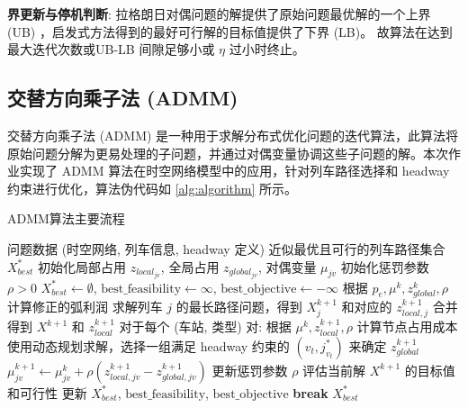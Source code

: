 \documentclass{article}
\begin{document}
\textbf{界更新与停机判断}:
拉格朗日对偶问题的解提供了原始问题最优解的一个上界 (UB) ，启发式方法得到的最好可行解的目标值提供了下界 (LB)。
故算法在达到最大迭代次数或UB-LB 间隙足够小或 $\eta$ 过小时终止。

\subsection{交替方向乘子法 (ADMM)}\label{subsec:-(admm)}
交替方向乘子法 (ADMM)
是一种用于求解分布式优化问题的迭代算法，此算法将原始问题分解为更易处理的子问题，并通过对偶变量协调这些子问题的解。本次作业实现了 ADMM
算法在时空网络模型中的应用，针对列车路径选择和 headway 约束进行优化，算法伪代码如 \ref{alg:algorithm} 所示。

\begin{algorithm}[h]
    \caption{ADMM算法主要流程}
    \begin{algorithmic}[1]
        \Require 问题数据 (时空网络, 列车信息, headway 定义)
        \Ensure 近似最优且可行的列车路径集合 $X_{best}^*$
        \State 初始化局部占用 $z_{local_{jv}}$, 全局占用 $z_{global_{jv}}$, 对偶变量 $\mu_{jv}$
        \State 初始化惩罚参数 $\rho > 0$
        \State $X_{best}^* \gets \emptyset$,
        $\text{best\_feasibility} \gets \infty$,
        $\text{best\_objective} \gets -\infty$
        \State {}
        \State 根据 $p_e, \mu^k, z_{global}^k, \rho$ 计算修正的弧利润
        \State 求解列车 $j$ 的最长路径问题，得到 $X_j^{k+1}$ 和对应的 $z_{local,j}^{k+1}$
        \EndFor
        \State 合并得到 $X^{k+1}$ 和 $z_{local}^{k+1}$
        \State {}
        \State 对于每个 (车站, 类型) 对:
        \State \quad 根据 $\mu^k, z_{local}^{k+1}, \rho$ 计算节点占用成本
        \State \quad 使用动态规划求解，选择一组满足 headway 约束的 $(v_t, j^*_{v_t})$
        来确定 $z_{global}^{k+1}$
        \State {}
        \State $\mu_{jv}^{k+1} \gets \mu_{jv}^k + \rho
        (z_{local,jv}^{k+1} - z_{global,jv}^{k+1})$
        \State 更新惩罚参数 $\rho$
        \State 评估当前解 $X^{k+1}$ 的目标值和可行性
        \State 更新 $X_{best}^*$, $\text{best\_feasibility}$,
        $\text{best\_objective}$
        \EndIf
        \State \textbf{break}
        \EndIf
        \EndFor
        \State \Return $X_{best}^*$
    \end{algorithmic}\label{alg:algorithm}
\end{algorithm}
\end{document}
